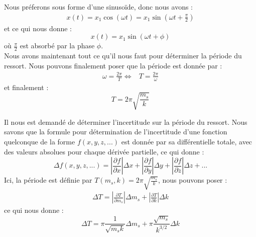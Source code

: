             Nous préferons sous forme d'une sinusoïde, donc nous avons :
            \begin{align*}
                x(t) = x_1 \cos(\omega t) = x_1 \sin(\omega t + \frac{\pi}{2})
            \end{align*}
            et ce qui nous donne :
            \begin{equation}
                x(t) = x_1 \sin(\omega t + \phi)
            \end{equation}
            où $\frac{\pi}{2}$ est absorbé par la phase $\phi$. \\
            Nous avons maintenant tout ce qu'il nous faut pour déterminer la période du ressort.
            Nous pouvons finalement poser que la période est donnée par :
            \begin{align*}
                \omega = \frac{2\pi}{T}
                \Leftrightarrow & T = \frac{2\pi}{\omega}
            \end{align*}
            et finalement :
            \begin{equation}
                T = 2\pi \sqrt{\frac{m_s}{k}}
            \end{equation}
            
            \newpage

            Il nous est demandé de déterminer l'incertitude sur la période du ressort.
            Nous savons que la formule pour détermination de l'incertitude d'une fonction quelconque de
            la forme $f(x, y, z, ...)$ est donnée par sa différentielle totale, avec des valeurs absolues pour
            chaque dérivée partielle, ce qui donne :
            \begin{equation}
                \Delta f(x, y, z, ...) = \left| \frac{\partial f}{\partial x} \right| \Delta x + \left| \frac{\partial f}{\partial y} \right| \Delta y + \left| \frac{\partial f}{\partial z} \right| \Delta z + ...
            \end{equation}
            Ici, la période est définie par $T(m_s, k) = 2\pi \sqrt{\frac{m_s}{k}}$, nous pouvons poser :
            \begin{align*}
                \Delta T = \left| \frac{\partial T}{\partial m_s} \right| \Delta m_s + \left| \frac{\partial T}{\partial k} \right| \Delta k
            \end{align*}
            ce qui nous donne :
            \begin{equation}
                \Delta T = \pi \frac{1}{\sqrt{m_s k}} \Delta m_s + \pi \frac{\sqrt{m_s}}{k^{3/2}} \Delta k
            \end{equation}

            
                    
    


    
    
        
